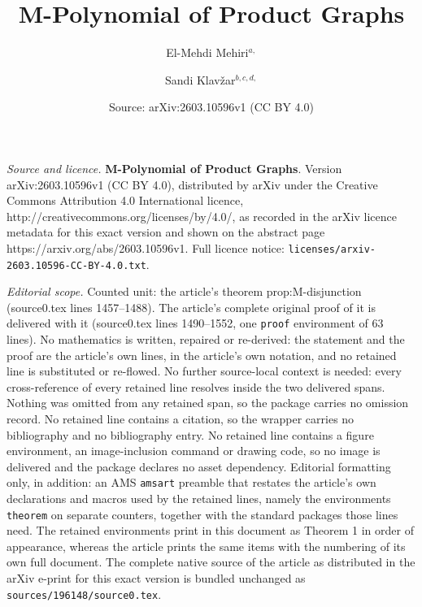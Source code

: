 \documentclass[10pt,a4paper]{amsart}
\title{\textbf{M-Polynomial of Product Graphs}}
\author{El-Mehdi Mehiri$^{a, }$ \and Sandi Klav{\v{z}}ar$^{b, c, d, }$}
\date{Source: arXiv:2603.10596v1 (CC BY 4.0)}
\begin{document}
\maketitle

\noindent\emph{Source and licence.} \textbf{M-Polynomial of Product Graphs}. Version arXiv:2603.10596v1 (CC BY 4.0), distributed by arXiv under the Creative Commons Attribution 4.0 International licence, http://creativecommons.org/licenses/by/4.0/, as recorded in the arXiv licence metadata for this exact version and shown on the abstract page https://arxiv.org/abs/2603.10596v1. Full licence notice: \texttt{licenses/arxiv-2603.10596-CC-BY-4.0.txt}.\par\smallskip

\noindent\textit{Editorial scope.} Counted unit: the article's theorem prop:M-disjunction (source0.tex lines 1457--1488). The article's complete original proof of it is delivered with it (source0.tex lines 1490--1552, one \texttt{proof} environment of 63 lines). No mathematics is written, repaired or re-derived: the statement and the proof are the article's own lines, in the article's own notation, and no retained line is substituted or re-flowed.  No further source-local context is needed: every cross-reference of every retained line resolves inside the two delivered spans.  Nothing was omitted from any retained span, so the package carries no omission record.  No retained line contains a citation, so the wrapper carries no bibliography and no bibliography entry.  No retained line contains a figure environment, an image-inclusion command or drawing code, so no image is delivered and the package declares no asset dependency.  Editorial formatting only, in addition: an AMS \texttt{amsart} preamble that restates the article's own declarations and macros used by the retained lines, namely the environments \texttt{theorem} on separate counters, together with the standard packages those lines need.  The retained environments print in this document as Theorem 1 in order of appearance, whereas the article prints the same items with the numbering of its own full document.  The complete native source of the article as distributed in the arXiv e-print for this exact version is bundled unchanged as \texttt{sources/196148/source0.tex}.
\end{document}
